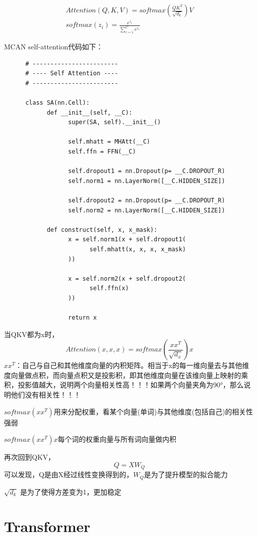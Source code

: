 \documentclass{article}
\begin{document}
\begin{sloppypar}
      \begin{gather}
            Attention(Q,K,V)=softmax(\frac{QK^T}{\sqrt{d_k}})V\\
            softmax(z_i)=\frac{e^{z_i}}{\sum_{c=1}^C e^{z_c}}
      \end{gather}

      MCAN self-attention代码如下：
      \begin{lstlisting}
      # ------------------------
      # ---- Self Attention ----
      # ------------------------

      class SA(nn.Cell):
            def __init__(self, __C):
                  super(SA, self).__init__()

                  self.mhatt = MHAtt(__C)
                  self.ffn = FFN(__C)

                  self.dropout1 = nn.Dropout(p= __C.DROPOUT_R)
                  self.norm1 = nn.LayerNorm([__C.HIDDEN_SIZE])

                  self.dropout2 = nn.Dropout(p= __C.DROPOUT_R)
                  self.norm2 = nn.LayerNorm([__C.HIDDEN_SIZE])

            def construct(self, x, x_mask):
                  x = self.norm1(x + self.dropout1(
                        self.mhatt(x, x, x, x_mask)
                  ))

                  x = self.norm2(x + self.dropout2(
                        self.ffn(x)
                  ))

                  return x
      \end{lstlisting}

      当QKV都为x时，
      $$
            Attention(x,x,x)=softmax(\frac{xx^T}{\sqrt{d_x}})x
      $$
      $xx^T$：自己与自己和其他维度向量的内积矩阵。相当于x的每一维向量去与其他维度向量做点积，而向量点积又是投影积，即其他维度向量在该维向量上映射的乘积，投影值越大，说明两个向量相关性高！！！如果两个向量夹角为90°，那么说明他们没有相关性！！！

      $softmax(xx^T)$用来分配权重，看某个向量(单词)与其他维度(包括自己)的相关性强弱

      $softmax(xx^T)x$每个词的权重向量与所有词向量做内积

      再次回到QKV，
      $$
            Q=XW_Q
      $$
      可以发现，Q是由X经过线性变换得到的，$W_Q$是为了提升模型的拟合能力

      $\sqrt{d_k}$ 是为了使得方差变为1，更加稳定

      \section{Transformer}


\end{sloppypar}
\end{document}

